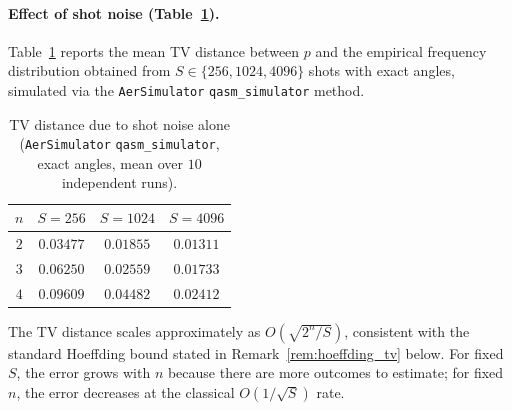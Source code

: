 \documentclass{article}
\numberwithin{equation}{section}
\begin{document}
\paragraph{Effect of shot noise (Table~\ref{tab:tv_shots}).}
Table~\ref{tab:tv_shots} reports the mean TV distance between $p$ and the empirical
frequency distribution obtained from $S\in\{256,1024,4096\}$ shots with exact angles,
simulated via the \texttt{AerSimulator} \texttt{qasm\_simulator} method.
\begin{table}[h]
\centering
\begin{tabular}{c|ccc}
$n$ & $S=256$ & $S=1024$ & $S=4096$ \\
\hline
$2$ & $0.03477$ & $0.01855$ & $0.01311$ \\
$3$ & $0.06250$ & $0.02559$ & $0.01733$ \\
$4$ & $0.09609$ & $0.04482$ & $0.02412$ \\
\end{tabular}
\caption{TV distance due to shot noise alone
(\texttt{AerSimulator} \texttt{qasm\_simulator}, exact angles,
mean over $10$ independent runs).}
\label{tab:tv_shots}
\end{table}
The TV distance scales approximately as $O(\sqrt{2^n/S})$, consistent with the
standard Hoeffding bound stated in Remark~\ref{rem:hoeffding_tv} below.
For fixed $S$, the error grows with $n$ because there are more outcomes to estimate;
for fixed $n$, the error decreases at the classical $O(1/\sqrt{S})$ rate.
\end{document}
